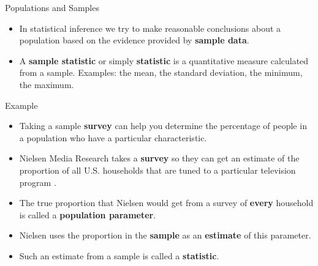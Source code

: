\documentclass[handout]{beamer}
\begin{document}
\begin{frame}{Populations and Samples}
\scriptsize{
\begin{itemize}
 \item In statistical inference we try to make reasonable conclusions about a population based on the evidence provided by \textbf{sample data}.

 
 \item A \textbf{sample statistic} or simply \textbf{statistic} is a quantitative measure calculated from a sample. Examples: the mean, the standard deviation, the minimum, the maximum.
 
 

\end{itemize}

\begin{block}{Example}
\begin{itemize}

\item  Taking a sample \textbf{survey} can help you determine the percentage of people in a population who have a particular characteristic.

 \item Nielsen Media Research takes a \textbf{survey} so they can get an estimate of the proportion of all U.S. households that are tuned to a particular television program  \cite{watkins2010statistics}.
 
\item The true proportion that Nielsen would get from a survey of \textbf{every} household is called a \textbf{population parameter}.

\item Nielsen uses the proportion in the \textbf{sample} as an
\textbf{estimate} of this parameter. 

\item Such an estimate from a sample is called a \textbf{statistic}.
 
\end{itemize}

 
\end{block}


} 
\end{frame}
\end{document}
